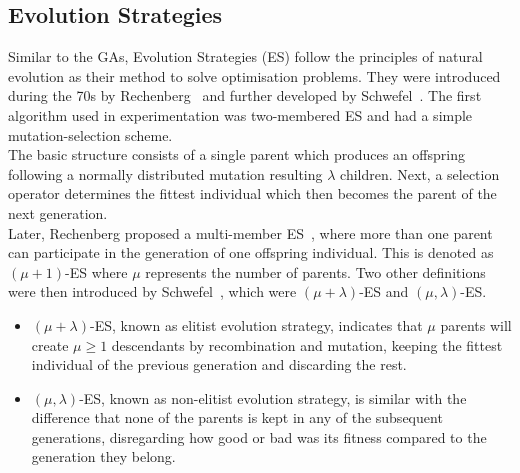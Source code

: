 \subsection{Evolution Strategies}

Similar to the GAs, Evolution Strategies (ES) follow the principles of natural evolution as their method to solve optimisation problems. They were introduced during the 70s by Rechenberg~\cite{huning1976evolutionsstrategie} and further developed by Schwefel~\cite{back1991survey}. The first algorithm used in experimentation was two-membered ES and had a simple mutation-selection scheme.\\

The basic structure consists of a single parent which produces an offspring following a normally distributed mutation resulting $\lambda$ children. Next, a selection operator determines the fittest individual which then becomes the parent of the next generation.\\


Later, Rechenberg proposed a multi-member ES~\cite{huning1976evolutionsstrategie}, where more than one parent can participate in the generation of one offspring individual. This is denoted as $(\mu + 1)$-ES where $\mu$ represents the number of parents. Two other definitions were then introduced by Schwefel~\cite{reynolds2003effects}, which were $(\mu + \lambda)$-ES and $(\mu, \lambda)$-ES.\\

\begin{itemize}
    \item $(\mu + \lambda)$-ES, known as elitist evolution strategy, indicates that $\mu$ parents will create $\mu \geq 1$ descendants by recombination and mutation, keeping the fittest individual of the previous generation and discarding the rest.
    \item $(\mu, \lambda)$-ES, known as non-elitist evolution strategy, is similar with the difference that none of the parents is kept in any of the subsequent generations, disregarding how good or bad was its fitness compared to the generation they belong.
\end{itemize}

